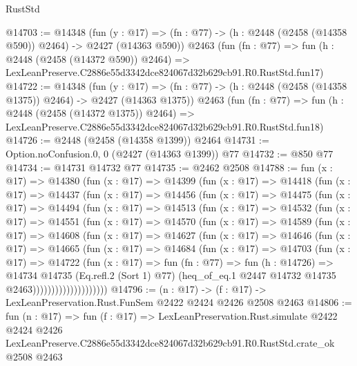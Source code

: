 \begin{lexlean}{RustStd}
\begin{coremodule}
@14703 := @14348
    (fun (y : @17) => (fn : @77) -> (h : @2448 (@2458 (@14358 @590)) @2464) -> @2427 (@14363 @590))
    @2463
    (fun (fn : @77) =>
    fun (h : @2448 (@2458 (@14372 @590)) @2464) =>
    LexLeanPreserve.C2886e55d3342dce824067d32b629cb91.R0.RustStd.fun17)
@14722 := @14348
    (fun (y : @17) =>
    (fn : @77) -> (h : @2448 (@2458 (@14358 @1375)) @2464) -> @2427 (@14363 @1375))
    @2463
    (fun (fn : @77) =>
    fun (h : @2448 (@2458 (@14372 @1375)) @2464) =>
    LexLeanPreserve.C2886e55d3342dce824067d32b629cb91.R0.RustStd.fun18)
@14726 := @2448 (@2458 (@14358 @1399)) @2464
@14731 := Option.noConfusion.{0, 0} (@2427 (@14363 @1399)) @77
@14732 := @850 @77
@14734 := @14731 @14732 @77
@14735 := @2462 @2508
@14788 := fun (x : @17) =>
  @14380
    (fun (x : @17) =>
    @14399
      (fun (x : @17) =>
      @14418
        (fun (x : @17) =>
        @14437
          (fun (x : @17) =>
          @14456
            (fun (x : @17) =>
            @14475
              (fun (x : @17) =>
              @14494
                (fun (x : @17) =>
                @14513
                  (fun (x : @17) =>
                  @14532
                    (fun (x : @17) =>
                    @14551
                      (fun (x : @17) =>
                      @14570
                        (fun (x : @17) =>
                        @14589
                          (fun (x : @17) =>
                          @14608
                            (fun (x : @17) =>
                            @14627
                              (fun (x : @17) =>
                              @14646
                                (fun (x : @17) =>
                                @14665
                                  (fun (x : @17) =>
                                  @14684
                                    (fun (x : @17) =>
                                    @14703
                                      (fun (x : @17) =>
                                      @14722
                                        (fun (x : @17) =>
                                        fun (fn : @77) =>
                                        fun (h : @14726) =>
                                        @14734
                                          @14735
                                          (Eq.refl.{2} (Sort 1) @77)
                                          (heq_of_eq.{1}
                                            @2447
                                            @14732
                                            @14735
                                            @2463))))))))))))))))))))
@14796 := (n : @17) -> (f : @17) -> LexLeanPreservation.Rust.FunSem @2422 @2424 @2426 @2508 @2463
@14806 := fun (n : @17) =>
  fun (f : @17) =>
  LexLeanPreservation.Rust.simulate
    @2422
    @2424
    @2426
    LexLeanPreserve.C2886e55d3342dce824067d32b629cb91.R0.RustStd.crate_ok
    @2508
    @2463
\end{coremodule}
\end{lexlean}
